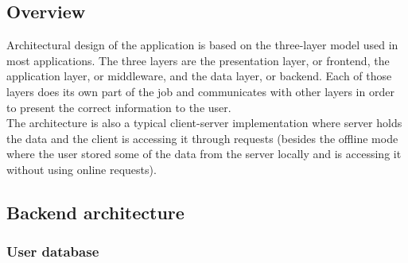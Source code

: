 \subsection{Overview}
\hspace{\parindent}Architectural design of the application is based on the three-layer model used in most applications. The three layers are the presentation layer, or frontend, the application layer, or middleware, and the data layer, or backend. Each of those layers does its own part of the job and communicates with other layers in order to present the correct information to the user.\\
The architecture is also a typical client-server implementation where server holds the data and the client is accessing it through requests (besides the offline mode where the user stored some of the data from the server locally and is accessing it without using online requests).\\
\newpage
\subsection{Backend architecture}
\subsubsection{User database}

